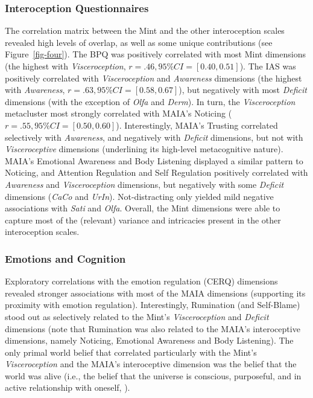 \documentclass[
  man,
  floatsintext,
  longtable,
  nolmodern,
  notxfonts,
  notimes,
  mask,
  colorlinks=true,linkcolor=blue,citecolor=blue,urlcolor=blue]{apa7}
\begin{document}
\subsubsection{Interoception
Questionnaires}\label{interoception-questionnaires-1}

The correlation matrix between the Mint and the other interoception
scales revealed high levels of overlap, as well as some unique
contributions (see Figure~\ref{fig-four}). The BPQ was positively
correlated with most Mint dimensions (the highest with
\emph{Visceroception}, \textbf{\(r = .46, 95\% CI = [0.40, 0.51]\)}).
The IAS was positively correlated with \emph{Visceroception} and
\emph{Awareness} dimensions (the highest with \emph{Awareness},
\textbf{\(r = .63, 95\% CI = [0.58, 0.67]\)}), but negatively with most
\emph{Deficit} dimensions (with the exception of \emph{Olfa} and
\emph{Derm}). In turn, the \emph{Visceroception} metacluster most
strongly correlated with MAIA's Noticing
(\textbf{\(r = .55, 95\% CI = [0.50, 0.60]\)}). Interestingly, MAIA's
Trusting correlated selectively with \emph{Awareness}, and negatively
with \emph{Deficit} dimensions, but not with \emph{Visceroceptive}
dimensions (underlining its high-level metacognitive nature). MAIA's
Emotional Awareness and Body Listening displayed a similar pattern to
Noticing, and Attention Regulation and Self Regulation positively
correlated with \emph{Awareness} and \emph{Visceroception} dimensions,
but negatively with some \emph{Deficit} dimensions (\emph{CaCo} and
\emph{UrIn}). Not-distracting only yielded mild negative associations
with \emph{Sati} and \emph{Olfa}. Overall, the Mint dimensions were able
to capture most of the (relevant) variance and intricacies present in
the other interoception scales.

\subsubsection{Emotions and Cognition}\label{emotions-and-cognition-1}

Exploratory correlations with the emotion regulation (CERQ) dimensions
revealed stronger associations with most of the MAIA dimensions
(supporting its proximity with emotion regulation). Interestingly,
Rumination (and Self-Blame) stood out as selectively related to the
Mint's \emph{Visceroception} and \emph{Deficit} dimensions (note that
Rumination was also related to the MAIA's interoceptive dimensions,
namely Noticing, Emotional Awareness and Body Listening). The only
primal world belief that correlated particularly with the Mint's
\emph{Visceroception} and the MAIA's interoceptive dimension was the
belief that the world was alive (i.e., the belief that the universe is
conscious, purposeful, and in active relationship with oneself,
).
\end{document}

